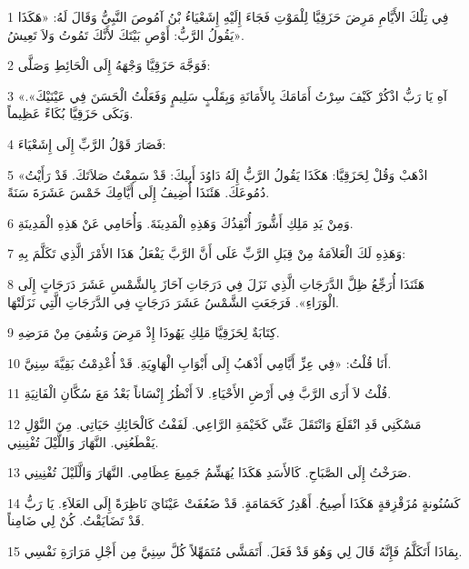 \par 1 فِي تِلْكَ الأَيَّامِ مَرِضَ حَزَقِيَّا لِلْمَوْتِ فَجَاءَ إِلَيْهِ إِشَعْيَاءُ بْنُ آمُوصَ النَّبِيُّ وَقَالَ لَهُ: «هَكَذَا يَقُولُ الرَّبُّ: أَوْصِ بَيْتَكَ لأَنَّكَ تَمُوتُ وَلاَ تَعِيشُ».
\par 2 فَوَجَّهَ حَزَقِيَّا وَجْهَهُ إِلَى الْحَائِطِ وَصَلَّى:
\par 3 «آهِ يَا رَبُّ اذْكُرْ كَيْفَ سِرْتُ أَمَامَكَ بِالأَمَانَةِ وَبِقَلْبٍ سَلِيمٍ وَفَعَلْتُ الْحَسَنَ فِي عَيْنَيْكَ». وَبَكَى حَزَقِيَّا بُكَاءً عَظِيماً.
\par 4 فَصَارَ قَوْلُ الرَّبِّ إِلَى إِشَعْيَاءَ:
\par 5 «اذْهَبْ وَقُلْ لِحَزَقِيَّا: هَكَذَا يَقُولُ الرَّبُّ إِلَهُ دَاوُدَ أَبِيكَ: قَدْ سَمِعْتُ صَلاَتَكَ. قَدْ رَأَيْتُ دُمُوعَكَ. هَئَنَذَا أُضِيفُ إِلَى أَيَّامِكَ خَمْسَ عَشَرَةَ سَنَةً.
\par 6 وَمِنْ يَدِ مَلِكِ أَشُّورَ أُنْقِذُكَ وَهَذِهِ الْمَدِينَةَ. وَأُحَامِي عَنْ هَذِهِ الْمَدِينَةِ.
\par 7 وَهَذِهِ لَكَ الْعَلاَمَةُ مِنْ قِبَلِ الرَّبِّ عَلَى أَنَّ الرَّبَّ يَفْعَلُ هَذَا الأَمْرَ الَّذِي تَكَلَّمَ بِهِ:
\par 8 هَئَنَذَا أُرَجِّعُ ظِلَّ الدَّرَجَاتِ الَّذِي نَزَلَ فِي دَرَجَاتِ آحَازَ بِالشَّمْسِ عَشَرَ دَرَجَاتٍ إِلَى الْوَرَاءِ». فَرَجَعَتِ الشَّمْسُ عَشَرَ دَرَجَاتٍ فِي الدَّرَجَاتِ الَّتِي نَزَلَتْهَا.
\par 9 كِتَابَةٌ لِحَزَقِيَّا مَلِكِ يَهُوذَا إِذْ مَرِضَ وَشُفِيَ مِنْ مَرَضِهِ.
\par 10 أَنَا قُلْتُ: «فِي عِزِّ أَيَّامِي أَذْهَبُ إِلَى أَبْوَابِ الْهَاوِيَةِ. قَدْ أُعْدِمْتُ بَقِيَّةَ سِنِيَّ.
\par 11 قُلْتُ لاَ أَرَى الرَّبَّ فِي أَرْضِ الأَحْيَاءِ. لاَ أَنْظُرُ إِنْسَاناً بَعْدُ مَعَ سُكَّانِ الْفَانِيَةِ.
\par 12 مَسْكَنِي قَدِ انْقَلَعَ وَانْتَقَلَ عَنِّي كَخَيْمَةِ الرَّاعِي. لَفَفْتُ كَالْحَائِكِ حَيَاتِي. مِنَ النَّوْلِ يَقْطَعُنِي. النَّهَارَ وَاللَّيْلَ تُفْنِينِي.
\par 13 صَرَخْتُ إِلَى الصَّبَاحِ. كَالأَسَدِ هَكَذَا يُهَشِّمُ جَمِيعَ عِظَامِي. النَّهَارَ وَالَّلَيْلَ تُفْنِينِي.
\par 14 كَسُنُونةٍ مُزَقْزِقةٍ هَكَذَا أَصِيحُ. أَهْدِرُ كَحَمَامَةٍ. قَدْ ضَعُفَتْ عَيْنَايَ نَاظِرَةً إِلَى العَلاَءِ. يَا رَبُّ قَدْ تَضَايَقْتُ. كُنْ لِي ضَامِناً.
\par 15 بِمَاذَا أَتَكَلَّمُ فَإِنَّهُ قَالَ لِي وَهُوَ قَدْ فَعَلَ. أَتَمَشَّى مُتَمَهِّلاً كُلَّ سِنِيَّ مِن أَجْلِ مَرَارَةِ نَفْسِي.
